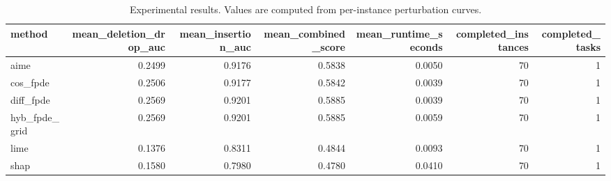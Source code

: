 \begin{table}[t]
\caption{Experimental results. Values are computed from per-instance perturbation curves.}
\label{tab:main_results_computed}
\centering
\begin{tabular}{lrrrrrr}
\toprule
method & mean\_deletion\_drop\_auc & mean\_insertion\_auc & mean\_combined\_score & mean\_runtime\_seconds & completed\_instances & completed\_tasks \\
\midrule
aime & 0.2499 & 0.9176 & 0.5838 & 0.0050 & 70 & 1 \\
cos\_fpde & 0.2506 & 0.9177 & 0.5842 & 0.0039 & 70 & 1 \\
diff\_fpde & 0.2569 & 0.9201 & 0.5885 & 0.0039 & 70 & 1 \\
hyb\_fpde\_grid & 0.2569 & 0.9201 & 0.5885 & 0.0059 & 70 & 1 \\
lime & 0.1376 & 0.8311 & 0.4844 & 0.0093 & 70 & 1 \\
shap & 0.1580 & 0.7980 & 0.4780 & 0.0410 & 70 & 1 \\
\bottomrule
\end{tabular}

\end{table}
